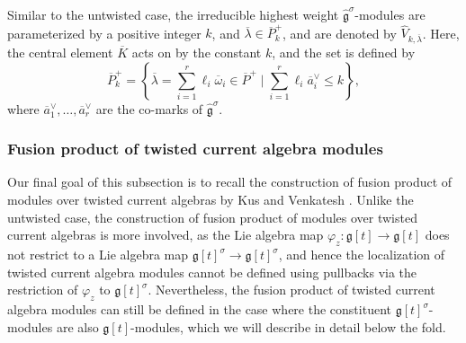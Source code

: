 \documentclass[10pt,a4paper]{amsart}
\numberwithin{equation}{section}
\begin{document}
Similar to the untwisted case, the irreducible highest weight $\widehat{\mathfrak{g}}^{\sigma}$-modules are parameterized by a positive integer $k$, and $\overline{\lambda}\in \overline{P}_k^+$, and are denoted by $\widehat{V}_{k,\overline{\lambda}}$. Here, the central element $\overline{K}$ acts on  by the constant $k$, and the set  is defined by
\begin{equation*}
\overline{P}_k^+=\left\{\overline{\lambda}=\sum_{i=1}^r\ell_i\overline{\omega}_i\in \overline{P}^+\mid \sum_{i=1}^r\ell_i\overline{a}_i^{\vee}\leq k\right\},
\end{equation*}
where $\overline{a}_1^{\vee},\dots,\overline{a}_r^{\vee}$ are the co-marks of $\widehat{\mathfrak{g}}^{\sigma}$.

\subsubsection{Fusion product of twisted current algebra modules}\label{Section 2.4.1}

Our final goal of this subsection is to recall the construction of fusion product of modules over twisted current algebras by Kus and Venkatesh \cite{KV16}. Unlike the untwisted case, the construction of fusion product of modules over twisted current algebras is more involved, as the Lie algebra map $\varphi_z\colon\mathfrak{g}[t]\to\mathfrak{g}[t]$ does not restrict to a Lie algebra map $\mathfrak{g}[t]^{\sigma}\to\mathfrak{g}[t]^{\sigma}$, and hence the localization of twisted current algebra modules cannot be defined using pullbacks via the restriction of $\varphi_z$ to $\mathfrak{g}[t]^{\sigma}$. Nevertheless, the fusion product of twisted current algebra modules can still be defined in the case where the constituent $\mathfrak{g}[t]^{\sigma}$-modules are also $\mathfrak{g}[t]$-modules, which we will describe in detail below the fold.
\end{document}
